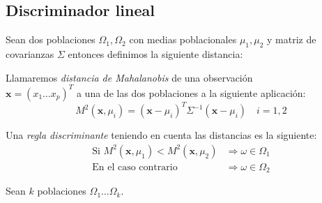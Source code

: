 \subsection*{Discriminador lineal}
\noindent Sean dos poblaciones $\Omega_1, \Omega_2 $ con medias poblacionales $\mu_1,\mu_2$ y matriz de covarianzas $\Sigma$ entonces definimos la siguiente distancia:
\begin{defi}
Llamaremos \textit{distancia de Mahalanobis} de una observación\\$\textbf{x}=(x_1\ldots x_p)^T$ a una de las dos poblaciones  a la siguiente aplicación:
\begin{equation}
 M^2(\textbf{x},\mu_i)=(\textbf{x}-\mu_i)^T\Sigma^{-1}(\textbf{x}-\mu_i)\quad i=1,2
\end{equation} 
\end{defi} 

\noindent Una \textit{regla discriminante} teniendo en cuenta las distancias es la siguiente:
\begin{equation}
\begin{split}
\text{Si } M^2(\textbf{x},\mu_1)< M^2(\textbf{x},\mu_2) &\Rightarrow \omega\in \Omega_1\\ 
\text{En el caso contrario } &\Rightarrow \omega\in \Omega_2
\end{split}
\end{equation}

\noindent Sean $k$ poblaciones $\Omega_1 \ldots \Omega_k$.